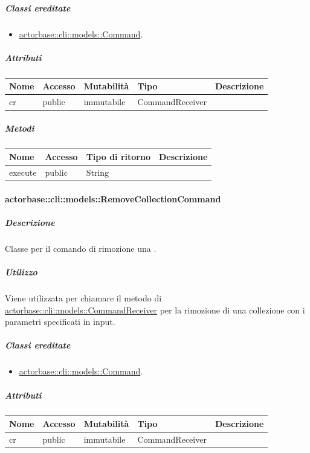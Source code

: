 \documentclass{scalatekids-article}
\begin{document}
\subparagraph{Classi ereditate}

\begin{itemize}
\item \hyperref[sec:actorbase::cli::models::Command]{actorbase::cli::models::Command}.
\end{itemize}

\subparagraph{Attributi}

\begin{tabular}{| l | l | l | l | l |}
	\hline
	Nome & Accesso & Mutabilità & Tipo & Descrizione\\
	\hline
	cr & public & immutabile & CommandReceiver & \\
	\hline
\end{tabular}

\subparagraph{Metodi}

\begin{tabular}{| l | l | l | l |}
	\hline
	Nome & Accesso & Tipo di ritorno & Descrizione\\
	\hline
	execute & public & String & \\
	\hline
\end{tabular}

\paragraph{actorbase::cli::models::RemoveCollectionCommand}
\label{sec:actorbase::cli::models::RemoveCollectionCommand}

\subparagraph{Descrizione}

Classe per il comando di rimozione una .

\subparagraph{Utilizzo}

Viene utilizzata per chiamare il metodo di
\hyperref[sec:actorbase::cli::models::CommandReceiver]{actorbase::cli::models::CommandReceiver} per la rimozione di una collezione con
i parametri specificati in input.

\subparagraph{Classi ereditate}

\begin{itemize}
\item \hyperref[sec:actorbase::cli::models::Command]{actorbase::cli::models::Command}.
\end{itemize}

\subparagraph{Attributi}

\begin{tabular}{| l | l | l | l | l |}
	\hline
	Nome & Accesso & Mutabilità & Tipo & Descrizione\\
	\hline
	cr & public & immutabile & CommandReceiver & \\
	\hline
\end{tabular}
\end{document}
